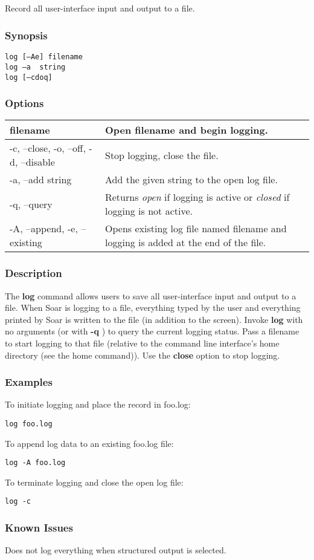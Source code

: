 \subsection{}
\label{log}
Record all user-interface input and output to a file. 
\subsubsection*{Synopsis}
\begin{verbatim}
log [–Ae] filename
log –a  string
log [–cdoq]
\end{verbatim}
\subsubsection*{Options}
\begin{tabular}{|l|l|}
\hline 
 filename  & Open filename and begin logging.  \\
 \hline 
 -c, --close, -o, --off, -d, --disable  & Stop logging, close the file.  \\
 \hline 
 -a, --add string  & Add the given string to the open log file.  \\
 \hline 
 -q, --query  & Returns \emph{open}
 if logging is active or \emph{closed}
 if logging is not active.  \\
 \hline 
 -A, --append, -e, --existing  & Opens existing log file named filename and logging is added at the end of the file.  \\
 \hline 
\end{tabular}
\subsubsection*{Description}
 The \textbf{log}
 command allows users to save all user-interface input and output to a file. When Soar is logging to a file, everything typed by the user and everything printed by Soar is written to the file (in addition to the screen). 
 Invoke \textbf{log}
 with no arguments (or with \textbf{-q}
) to query the current logging status. Pass a filename to start logging to that file (relative to the command line interface's home directory (see the home command)). Use the \textbf{close}
 option to stop logging. 
\subsubsection*{Examples}
 To initiate logging and place the record in foo.log: \begin{verbatim}
log foo.log
\end{verbatim}
 To append log data to an existing foo.log file: \begin{verbatim}
log -A foo.log
\end{verbatim}
 To terminate logging and close the open log file: \begin{verbatim}
log -c
\end{verbatim}
\subsubsection*{Known Issues}
 Does not log everything when structured output is selected. 
